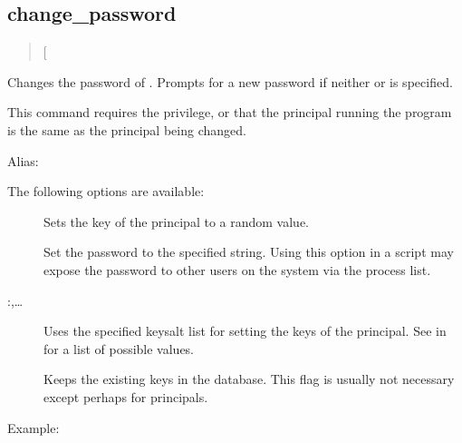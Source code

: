 \documentclass[letterpaper,10pt,english]{sphinxmanual}
\begin{document}
\subsection{change\_password}
\label{\detokenize{admin/database:change-password}}\begin{quote}

 {[}\sphinxstyleemphasis{options}{]} 
\end{quote}

Changes the password of .  Prompts for a new password if
neither  or  is specified.

This command requires the  privilege, or that the
principal running the program is the same as the principal being
changed.

Alias: 

The following options are available:
\begin{description}
\item[{}] \leavevmode
Sets the key of the principal to a random value.

\item[{ }] \leavevmode
Set the password to the specified string.  Using this option in a
script may expose the password to other users on the system via
the process list.

\item[{ :,…}] \leavevmode
Uses the specified keysalt list for setting the keys of the
principal.  See {\hyperref[\detokenize{admin/conf_files/kdc_conf:keysalt-lists}]{}} in {\hyperref[\detokenize{admin/conf_files/kdc_conf:kdc-conf-5}]{}} for a
list of possible values.

\item[{}] \leavevmode
Keeps the existing keys in the database.  This flag is usually not
necessary except perhaps for  principals.

\end{description}

Example:

%
\begin{sphinxVerbatim}[commandchars=\\\{\}]
  
    
    
   
\end{sphinxVerbatim}
\end{document}
